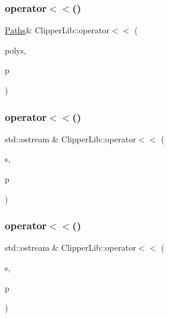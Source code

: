 \mbox{\label{namespace_clipper_lib_aa0bb38565ca4b15c637b38f476d21036}} 
\subsubsection{\texorpdfstring{operator$<$$<$()}{operator<<()}\hspace{0.1cm}{\footnotesize\ttfamily [2/5]}}
{\footnotesize\ttfamily \mbox{\hyperlink{namespace_clipper_lib_a4bab1d9e10805fa6f1fd3b78c56efcfe}{Paths}}\& Clipper\+Lib\+::operator$<$$<$ (\begin{DoxyParamCaption}\item[{\mbox{\hyperlink{namespace_clipper_lib_a4bab1d9e10805fa6f1fd3b78c56efcfe}{Paths}} \&}]{polys,  }\item[{const \mbox{\hyperlink{namespace_clipper_lib_af39c8fe00f278f18cc8142fef41242da}{Path}} \&}]{p }\end{DoxyParamCaption})\hspace{0.3cm}{\ttfamily [inline]}}

\mbox{\label{namespace_clipper_lib_a2e9613a92f21ac827d5b7f8b5ade5795}} 
\subsubsection{\texorpdfstring{operator$<$$<$()}{operator<<()}\hspace{0.1cm}{\footnotesize\ttfamily [3/5]}}
{\footnotesize\ttfamily std\+::ostream \& Clipper\+Lib\+::operator$<$$<$ (\begin{DoxyParamCaption}\item[{std\+::ostream \&}]{s,  }\item[{const \mbox{\hyperlink{struct_clipper_lib_1_1_int_point}{Int\+Point}} \&}]{p }\end{DoxyParamCaption})}

\mbox{\label{namespace_clipper_lib_abd88603a8c170404d069edae2e574fe9}} 
\subsubsection{\texorpdfstring{operator$<$$<$()}{operator<<()}\hspace{0.1cm}{\footnotesize\ttfamily [4/5]}}
{\footnotesize\ttfamily std\+::ostream \& Clipper\+Lib\+::operator$<$$<$ (\begin{DoxyParamCaption}\item[{std\+::ostream \&}]{s,  }\item[{const \mbox{\hyperlink{namespace_clipper_lib_af39c8fe00f278f18cc8142fef41242da}{Path}} \&}]{p }\end{DoxyParamCaption})}


